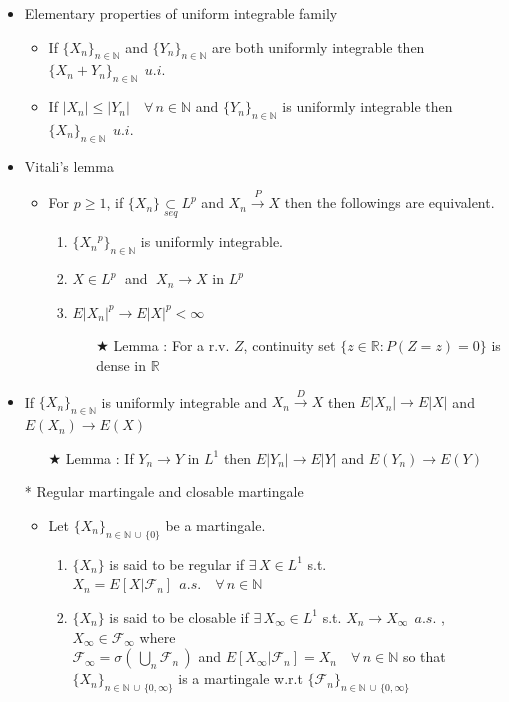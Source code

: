 \documentclass[12pt, A4]{article}
\newcommand{\trick}{$\bigstar$}
\newcommand{\N}{\mathbb{N}}
\newcommand{\R}{\mathbb{R}}
\newcommand{\F}{\mathcal{F}}
\newcommand{\seq}{\underset{seq}{\subset}}
\newcommand{\union}{\,\cup\,}
\newcommand{\exist}{\exists\,}
\newcommand{\convp}{\overset{P}{\rightarrow}}
\newcommand{\convd}{\overset{D}{\rightarrow}}
\newcommand{\foranyn}{\quad \forall \, n\in \N}
\begin{document}
\begin{itemize}
	\item Elementary properties of uniform integrable family
	\begin{itemize}
		\item If $\{X_n\}_{n\in \N}$ and $\{Y_n\}_{n\in \N}$ are both uniformly integrable then $\{X_n+Y_n\}_{n\in \N}\;\,u.i.$ 
		\item If $|X_n|\leq |Y_n| \foranyn$ and $\{Y_n\}_{n\in \N}$ is uniformly integrable then $\{X_n\}_{n\in \N}\;\, u.i.$
	\end{itemize} 
	\item Vitali's lemma
	\begin{itemize}
		\item For $p\geq 1$, if $\{X_n\}\seq L^p$ and $X_n\convp X$ then the followings are equivalent.
		\begin{enumerate}
			\item $\{{X_n}^p\}_{n\in \N}$ is uniformly integrable.
			\item $X\in L^p\;$ and $\;X_n\rightarrow X$ in $L^p$
			\item $E|X_n|^p\rightarrow E|X|^p<\infty$
			\begin{itemize}
				\item[\trick] Lemma : For a r.v. $Z$, continuity set $\{z\in \R : P(Z=z)=0\}$ is dense in $\R$
			\end{itemize}
		\end{enumerate}
	\end{itemize}
	\item If $\{X_n\}_{n\in \N}$ is uniformly integrable and $X_n\convd X$ then $E|X_n|\rightarrow E|X|$ and $E(X_n)\rightarrow E(X)$
	\begin{itemize}
		\item[\trick] Lemma : If $Y_n\rightarrow Y$ in $L^1$ then $E|Y_n|\rightarrow E|Y|$ and $E(Y_n)\rightarrow E(Y)$
	\end{itemize}
	\item[*] Regular martingale and closable martingale
	\begin{itemize}
		\item Let $\{X_n\}_{n\in \N\union \{0\}}$ be a martingale.
		\begin{enumerate}
			\item $\{X_n\}$ is said to be regular if $\exist X\in L^1$ s.t. $X_n=E[X|\F_n]\;\,a.s.\foranyn$
			\item $\{X_n\}$ is said to be closable if $\exist X_\infty\in L^1$ s.t. $X_n\rightarrow X_\infty\;\,a.s.$ , $X_\infty\in \F_\infty$ where \\$\F_\infty=\sigma(\,\bigcup_n \F_n\,)$ and  $E[X_\infty|\F_n]=X_n\foranyn$ so that \\ $\{X_n\}_{n\in \N\union \{0, \infty\}}$ is a martingale w.r.t $\{\F_n\}_{n\in \N\union \{0, \infty \}}$ 

\end{enumerate}
\end{itemize}
\end{itemize}
\end{document}
